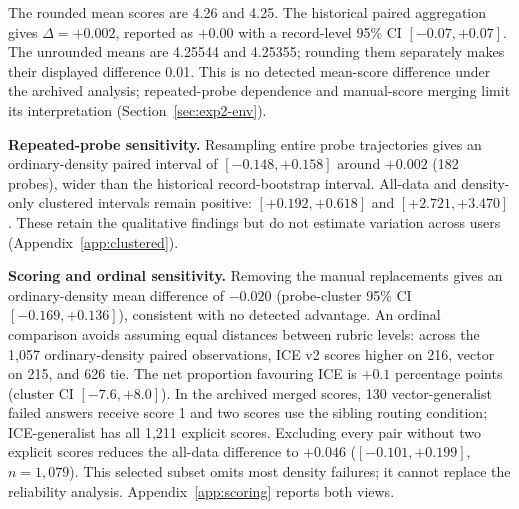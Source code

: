\documentclass[11pt,a4paper]{article}
\begin{document}
\begin{table}[htbp]
\centering
\small
\caption{Experiment 2, global comparison, Dataset C excluded (1{,}057 probe--checkpoint observations across 3 conversations). On the conversations where both systems can generate usable answers, ICE v2 has similar mean scores to the vector baseline, injects 32\% fewer fragments, and ranks first in 30.6\% of four-condition tournaments versus 21.2\%.}
\label{tab:exp2-global}
\end{table}

The rounded mean scores are 4.26 and 4.25. The historical paired aggregation gives $\Delta=+0.002$, reported as $+0.00$ with a record-level 95\% CI $[-0.07,+0.07]$. The unrounded means are 4.25544 and 4.25355; rounding them separately makes their displayed difference 0.01. This is no detected mean-score difference under the archived analysis; repeated-probe dependence and manual-score merging limit its interpretation (Section~\ref{sec:exp2-env}).

\textbf{Repeated-probe sensitivity.} Resampling entire probe trajectories gives an ordinary-density paired interval of $[-0.148,+0.158]$ around $+0.002$ (182 probes), wider than the historical record-bootstrap interval. All-data and density-only clustered intervals remain positive: $[+0.192,+0.618]$ and $[+2.721,+3.470]$. These retain the qualitative findings but do not estimate variation across users (Appendix~\ref{app:clustered}).

\textbf{Scoring and ordinal sensitivity.} Removing the manual replacements gives an ordinary-density mean difference of $-0.020$ (probe-cluster 95\% CI $[-0.169,+0.136]$), consistent with no detected advantage. An ordinal comparison avoids assuming equal distances between rubric levels: across the 1,057 ordinary-density paired observations, ICE v2 scores higher on 216, vector on 215, and 626 tie. The net proportion favouring ICE is $+0.1$ percentage points (cluster CI $[-7.6,+8.0]$). In the archived merged scores, 130 vector-generalist failed answers receive score 1 and two scores use the sibling routing condition; ICE-generalist has all 1,211 explicit scores. Excluding every pair without two explicit scores reduces the all-data difference to $+0.046$ ($[-0.101,+0.199]$, $n=1,079$). This selected subset omits most density failures; it cannot replace the reliability analysis. Appendix~\ref{app:scoring} reports both views.
\end{document}
